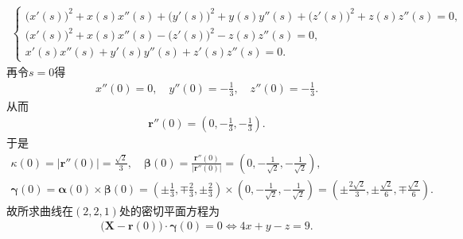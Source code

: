 \documentclass[../../main.tex]{subfiles}%
\begin{document}
\begin{solution}
\begin{align*}
\begin{cases}
\big(x'(s)\big)^2 + x(s)x''(s) + \big(y'(s)\big)^2 + y(s)y''(s) + \big(z'(s)\big)^2 + z(s)z''(s) = 0, \\
\big(x'(s)\big)^2 + x(s)x''(s) - \big(z'(s)\big)^2 - z(s)z''(s) = 0, \\
x'(s)x''(s) + y'(s)y''(s) + z'(s)z''(s) = 0.
\end{cases}
\end{align*}
再令$s=0$得
\begin{align*}
x''(0) = 0, \quad y''(0) = -\frac{1}{3}, \quad z''(0) = -\frac{1}{3}.
\end{align*}
从而
\begin{align*}
\bm{r}''(0) = \left( 0, -\frac{1}{3}, -\frac{1}{3} \right).
\end{align*}
于是
\begin{gather*}
\kappa(0) = \big| \bm{r}''(0) \big| = \frac{\sqrt{2}}{3}, \quad \bm{\beta}(0) = \frac{\bm{r}''(0)}{\big| \bm{r}''(0) \big|} = \left( 0, -\frac{1}{\sqrt{2}}, -\frac{1}{\sqrt{2}} \right), \\
\bm{\gamma}(0) = \bm{\alpha}(0) \times \bm{\beta}(0) = \left( \pm \frac{1}{3}, \mp \frac{2}{3}, \pm \frac{2}{3} \right) \times \left( 0, -\frac{1}{\sqrt{2}}, -\frac{1}{\sqrt{2}} \right) = \left( \pm \frac{2\sqrt{2}}{3}, \pm \frac{\sqrt{2}}{6}, \mp \frac{\sqrt{2}}{6} \right).
\end{gather*}
故所求曲线在$(2,2,1)$处的密切平面方程为
\begin{align*}
\big( \bm{X} - \bm{r}(0) \big) \cdot \bm{\gamma}(0) = 0 \Longleftrightarrow 4x + y - z = 9.
\end{align*}

\end{solution}
\end{document}
